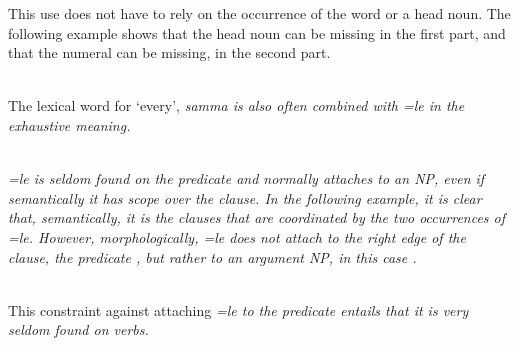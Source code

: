 This use does not have to rely on the occurrence of the word  or a head noun. The following example shows that the head noun can be missing in the first part, and that the numeral can be missing, in the second part.

 \\
The lexical word for `every', \em samma \em is also often combined with \em =le \em in the exhaustive meaning.

\\ 


\em =le \em is seldom found on the predicate and normally attaches to an NP, even if semantically it has scope over the clause. In the following example, it is clear that, semantically, it is the clauses that are coordinated by the two occurrences of \em =le\em. However,  morphologically, \em =le \em does not attach to the right edge of the clause,  the predicate , but rather to an argument NP, in this case .


\\

This constraint against attaching \em =le \em to the predicate entails that it is very seldom found on verbs. 


